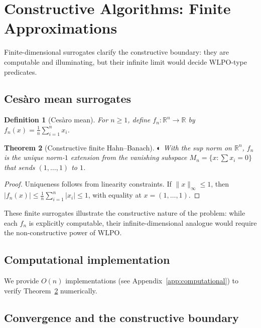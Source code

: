 \documentclass[11pt]{article}  %
\newtheorem{theorem}{Theorem}[section]
\newtheorem{definition}[theorem]{Definition}
\newenvironment{thm}{\begin{theorem}}{\end{theorem}}
\newenvironment{defi}{\begin{definition}}{\end{definition}}
\newtheorem{theorem}{Theorem}[section]
\newtheorem{definition}[theorem]{Definition}
\newenvironment{thm}{\begin{theorem}}{\end{theorem}}
\newenvironment{defi}{\begin{definition}}{\end{definition}}
\newcommand{\leanpartial}{\textsf{\small \textcolor{orange!80!black}{◐}}}
\newcommand{\R}{\mathbb{R}}
\newcommand{\WLPO}{\mathrm{WLPO}}
\begin{document}
\section{Constructive Algorithms: Finite Approximations}

Finite-dimensional surrogates clarify the constructive boundary: they are computable and illuminating, but their infinite limit would decide $\WLPO$-type predicates.

\subsection{Ces\`aro mean surrogates}

\begin{defi}[Ces\`aro mean]
For $n\ge 1$, define $f_n:\R^n\to\R$ by $f_n(x)=\frac{1}{n}\sum_{i=1}^n x_i$.
\end{defi}

\begin{thm}[Constructive finite Hahn--Banach]\label{thm:finite-hb}\leanpartial
With the sup norm on $\R^n$, $f_n$ is the unique norm-$1$ extension from the vanishing subspace $M_n=\{x:\sum x_i=0\}$ that sends $(1,\dots,1)$ to $1$.
\end{thm}

\begin{proof}
Uniqueness follows from linearity constraints. If $\|x\|_\infty\le 1$, then $|f_n(x)|\le \frac{1}{n}\sum_{i=1}^n|x_i|\le 1$, with equality at $x=(1,\dots,1)$.
\end{proof}

These finite surrogates illustrate the constructive nature of the problem: while each $f_n$ is explicitly computable, their infinite-dimensional analogue would require the non-constructive power of $\WLPO$.

\subsection{Computational implementation}

We provide $O(n)$ implementations (see Appendix~\ref{app:computational}) to verify Theorem~\ref{thm:finite-hb} numerically.

\subsection{Convergence and the constructive boundary}
\end{document}
